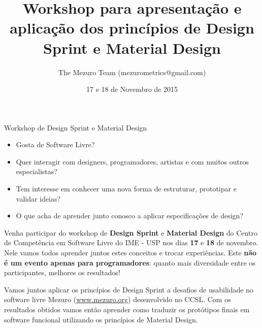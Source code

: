 \documentclass[final]{beamer} %
\title[Design Sprint \& Material Design]{Workshop para apresentação e aplicação dos princípios de Design Sprint e Material Design}
\author[Mezuro]{The Mezuro Team (mezurometrics@gmail.com)}
\institute[CCSL - IME - USP]{Centro de Competência em Software Livre, Instituto de Matemática e Estatística da universidade de São Paulo}
\date{17 e 18 de Novembro de 2015}
\begin{document}
\begin{frame}{}
  \begin{center}
    \veryHuge Workshop de Design Sprint e Material Design
  \end{center}
  \begin{center}
    \begin{minipage}{0.75\textwidth}
      \begin{exampleblock}{}
        \begin{large}
          \begin{itemize}
            \item Gosta de Software Livre?
            \item Quer interagir com designers, programadores, artistas e com muitos outros especialistas?
            \item Tem interesse em conhecer uma nova forma de estruturar, prototipar e validar ideias?
            \item O que acha de aprender junto conosco a aplicar especificações de design?
          \end{itemize}
        \end{large}
      \end{exampleblock}
    \end{minipage}
  \end{center}

  \vfill
  \begin{large}
    \begin{alertblock}{}
      Venha participar do workshop de \textbf{Design Sprint} e \textbf{Material Design} do Centro de Competência em 
      Software Livre do IME - USP nos dias \textbf{17} e \textbf{18} de novembro. Nele vamos todos aprender juntos estes
      conceitos e trocar experiências. Este \textbf{não é um evento apenas para programadores}: quanto mais diversidade
      entre os participantes, melhores os resultados!

      \vspace{1em}
      Vamos juntos aplicar os princípios de Design Sprint a desafios de usabilidade no software livre Mezuro
      (\url{www.mezuro.org}) desenvolvido no CCSL. Com os resultados obtidos vamos então aprender como traduzir os
      protótipos finais em software funcional utilizando os princípios de Material Design.
    \end{alertblock}
  \end{large}


\end{frame}
\end{document}
